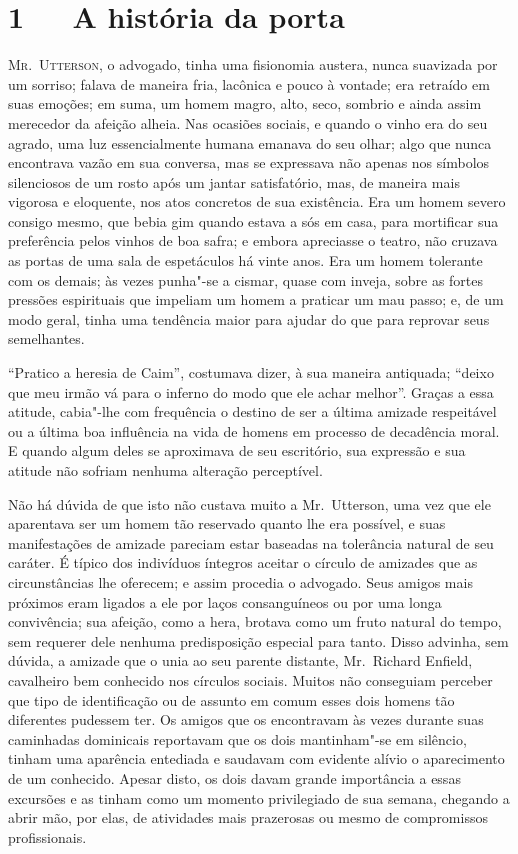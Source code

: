 
\chapter[1\ \ \ A história da porta]{1\ \ \ A história da porta}

\textsc{Mr.~Utterson,} o advogado, tinha uma fisionomia austera, nunca suavizada
por um sorriso; falava de maneira fria, lacônica e pouco à vontade; era
retraído em suas emoções; em suma, um homem magro, alto, seco, sombrio
e ainda assim merecedor da afeição alheia.  Nas ocasiões sociais, e
quando o vinho era do seu agrado, uma luz essencialmente humana emanava
do seu olhar; algo que nunca encontrava vazão em sua conversa, mas se
expressava não apenas nos símbolos silenciosos de um rosto após um
jantar satisfatório, mas, de maneira mais vigorosa e eloquente, nos
atos concretos de sua existência.  Era um homem severo consigo mesmo,
que bebia gim quando estava a sós em casa, para mortificar sua
preferência pelos vinhos de boa safra; e embora apreciasse o teatro,
não cruzava as portas de uma sala de espetáculos há vinte anos.  Era um
homem tolerante com os demais; às vezes punha"-se a cismar, quase com
inveja, sobre as fortes pressões espirituais que impeliam um homem a
praticar um mau passo; e, de um modo geral, tinha uma tendência maior
para ajudar do que para reprovar seus semelhantes.

“Pratico a heresia de Caim”, costumava dizer, à sua maneira antiquada;
“deixo que meu irmão vá para o inferno do modo que ele achar melhor”. 
Graças a essa atitude, cabia"-lhe com frequência o destino de ser a
última amizade respeitável ou a última boa influência na vida de homens
em processo de decadência moral.  E quando algum deles se aproximava de
seu escritório, sua expressão e sua atitude não sofriam nenhuma
alteração perceptível.

Não há dúvida de que isto não custava muito a Mr.~Utterson, uma vez que
ele aparentava ser um homem tão reservado quanto lhe era possível, e
suas manifestações de amizade pareciam estar baseadas na tolerância
natural de seu caráter.  É típico dos indivíduos íntegros aceitar o
círculo de amizades que as circunstâncias lhe oferecem; e assim
procedia o advogado.  Seus amigos mais próximos eram ligados a ele por
laços consanguíneos ou por uma longa convivência; sua afeição, como a
hera, brotava como um fruto natural do tempo, sem requerer dele nenhuma
predisposição especial para tanto.  Disso advinha, sem dúvida, a
amizade que o unia ao seu parente distante, Mr.~Richard Enfield,
cavalheiro bem conhecido nos círculos sociais.  Muitos não conseguiam
perceber que tipo de identificação ou de assunto em comum esses dois
homens tão diferentes pudessem ter.  Os amigos que os encontravam às
vezes durante suas caminhadas dominicais reportavam que os dois
mantinham"-se em silêncio, tinham uma aparência entediada e saudavam com
evidente alívio o aparecimento de um conhecido.  Apesar disto, os dois
davam grande importância a essas excursões e as tinham como um momento
privilegiado de sua semana, chegando a abrir mão, por elas, de
atividades mais prazerosas ou mesmo de compromissos profissionais.

